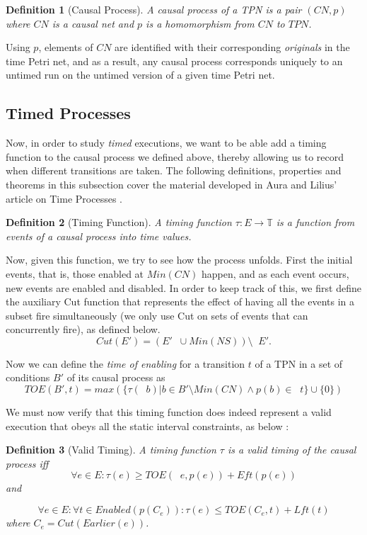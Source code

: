 \documentclass{article}
\DeclareMathOperator*{\pre}{^\bullet}
\theoremstyle{Definition}
\newtheorem{definition}{Definition}
\theoremstyle{definition}
\begin{document}
	\begin{definition}[Causal Process]\label{cp} A \textit{causal process} of a TPN is a pair $(CN, p)$ where $CN$ is a causal net and $p$ is a homomorphism from $CN$ to $TPN$. 
	\end{definition}
	
	Using $p$, elements of $CN$ are identified with their corresponding \emph{originals} in the time Petri net, and as a result, any causal process corresponds uniquely to an untimed run on the untimed version of a given time Petri net. 
	
	
	\subsection{Timed Processes}
	
		Now, in order to study \textit{timed} executions, we want to be able add a timing function to the causal process we defined above, thereby allowing us to record when different transitions are taken. 
		The following definitions, properties and theorems in this subsection cover the material developed in Aura and Lilius' article on Time Processes \cite{AL97}. 
	
	\begin{definition}[Timing Function]\label{tau} A \textit{timing function} $\tau : E \rightarrow \mathbb{T}$ is a function from events of a causal process into time values. 
	\end{definition}
	
	Now, given this function, we try to see how the process unfolds. 
	First the initial events, that is, those enabled at $Min(CN)$ happen, and as each event occurs, new events are enabled and disabled. 
	In order to keep track of this, we first define the auxiliary Cut function that represents the effect of having all the events in a subset fire simultaneously (we only use Cut on sets of events that can concurrently fire), as defined below. 
	$$Cut(E') = (E' \pre  \cup Min(NS)) \setminus \pre  E'.$$
	
	Now we can define the  \textit{time of enabling} for a transition $t$ of a TPN in a set of conditions $B'$ of its causal process as $$TOE(B', t) = max(\{\tau(\pre b) | b \in B' \setminus Min(CN) \wedge p(b) \in \pre  t\} \cup \{0\})$$
	
	We must now verify that this timing function does indeed represent a valid execution that obeys all the static interval constraints, as below : 
	
	\begin{definition}[Valid Timing] \label{validt} A timing function $\tau$ is a \textit{valid timing} of the causal process iff 
		$$\forall e \in E : \tau(e) \geq TOE(\pre e, p(e) ) + Eft(p(e))$$ and 
		
		$$\forall e \in E : \forall t \in Enabled (p(C_e)) : \tau(e) \leq TOE(C_e, t) + Lft(t)$$ 
		where $C_e = Cut(Earlier(e))$. 
	\end{definition}
\end{document}
